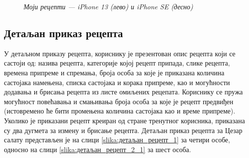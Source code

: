 \documentclass[12pt,oneside]{memoir}
\begin{document}
\begin{figure} [H]
    \caption{\textit{Моји рецепти --- iPhone 13 (лево) и iPhone SE (десно)}}
    \label{slika:моји_рецепти_1}
\end{figure}

\subsection{Детаљан приказ рецепта}
\label{subsec:детаљан_рецепт}

\indent У детаљном приказу рецепта, кориснику је презентован опис рецепта који се састоји од: назива рецепта, категорије којој рецепт припада, слике рецепта, времена припреме и спремања, броја особа за које је приказана количина састојака намењена, списка састојака и корака припреме, као и могућности додавања и брисања рецепта из листе омиљених рецепата. Кориснику се пружа могућност повећавања и смањивања броја особа за које је рецепт предвиђен (истовремено ће бити промењена количина састојака као и време припреме). Уколико је приказани рецепт креиран од стране тренутног корисника, приказана су два дугмета за измену и брисање рецепта. Детаљан приказ рецепта за Цезар салату представљен је на слици \ref{slika:детаљан_рецепт_1} за четири особе, односно на слици \ref{slika:детаљан_рецепт_2_1} за шест особа.
\end{document}
